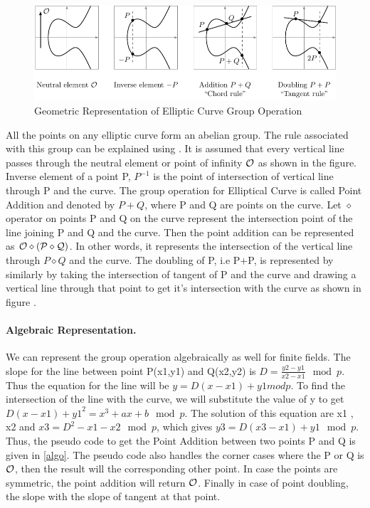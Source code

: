 \begin{figure}
\includegraphics{ecc/ec_group_operations.pdf}
\caption{Geometric Representation of Elliptic Curve Group Operation}
 \label{fig:oper}
\end{figure}

All the points on any elliptic curve form an abelian group. The rule associated with this group can be explained using . It is assumed that every vertical line passes through the neutral element or point of infinity $ \cal O$ as shown in the figure. Inverse element of a point P, $P^{-1}$ is the point of intersection of vertical line through P and the curve. The group operation for Elliptical Curve is called Point Addition and denoted by $P+Q$, where P and Q are points on the curve. Let $\diamond$ operator on points P and Q on the curve represent the intersection point of the line joining P and Q and the curve. Then the point addition can be represented as $\cal O \diamond (P \diamond Q)$. In other words, it represents the  intersection of the vertical line through $P \diamond Q$ and the curve. The doubling of P, i.e P+P, is represented by similarly by taking the intersection of tangent of P and the curve and drawing a vertical line through that point to get it's intersection with the curve as shown in figure .

\paragraph{Algebraic Representation.} We can represent the group operation algebraically as well for finite fields. The slope for the line between point P(x1,y1) and Q(x2,y2) is $D = \frac{y2-y1}{x2-x1} \mod p$. Thus the equation for the line will be  $y = D(x-x1) + y1 mod p$. To find the intersection of the line with the curve, we will substitute the value of y to get ${D(x-x1) + y1}^2 = x^3 + ax + b \mod p$. The solution of this equation are x1 , x2 and $x3 = D^2-x1-x2 \mod p$, which gives $y3 = D(x3-x1) + y1 \mod p$. Thus, the pseudo code to get the Point Addition between two points P and Q is given in \ref{algo}. The pseudo code also handles the corner cases where the P or Q is $\cal O$, then the result will the corresponding other point. In case the points are symmetric, the point addition will return $\cal O$. Finally in case of point doubling, the slope with the slope of tangent at that point.


